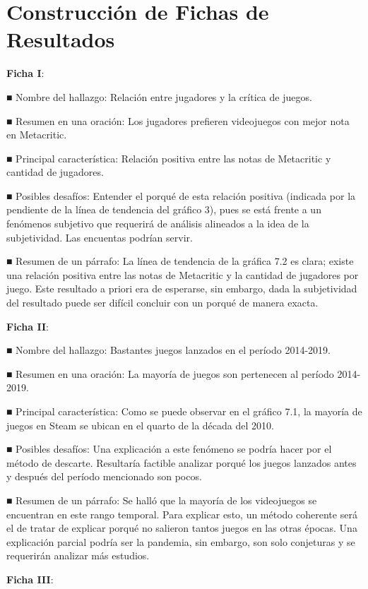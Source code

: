 \documentclass[
  letterpaper,
  DIV=11,
  numbers=noendperiod]{scrreprt}
\begin{document}
\hypertarget{construcciuxf3n-de-fichas-de-resultados}{%
\section{Construcción de Fichas de
Resultados}\label{construcciuxf3n-de-fichas-de-resultados}}

\textbf{Ficha I}:

■ Nombre del hallazgo: Relación entre jugadores y la crítica de juegos.

■ Resumen en una oración: Los jugadores prefieren videojuegos con mejor
nota en Metacritic.

■ Principal característica: Relación positiva entre las notas de
Metacritic y cantidad de jugadores.

■ Posibles desafíos: Entender el porqué de esta relación positiva
(indicada por la pendiente de la línea de tendencia del gráfico 3), pues
se está frente a un fenómenos subjetivo que requerirá de análisis
alineados a la idea de la subjetividad. Las encuentas podrían servir.

■ Resumen de un párrafo: La línea de tendencia de la gráfica 7.2 es
clara; existe una relación positiva entre las notas de Metacritic y la
cantidad de jugadores por juego. Este resultado a priori era de
esperarse, sin embargo, dada la subjetividad del resultado puede ser
difícil concluir con un porqué de manera exacta.

\textbf{Ficha II}:

■ Nombre del hallazgo: Bastantes juegos lanzados en el período
2014-2019.

■ Resumen en una oración: La mayoría de juegos son pertenecen al período
2014-2019.

■ Principal característica: Como se puede observar en el gráfico 7.1, la
mayoría de juegos en Steam se ubican en el quarto de la década del 2010.

■ Posibles desafíos: Una explicación a este fenómeno se podría hacer por
el método de descarte. Resultaría factible analizar porqué los juegos
lanzados antes y después del período mencionado son pocos.

■ Resumen de un párrafo: Se halló que la mayoría de los videojuegos se
encuentran en este rango temporal. Para explicar esto, un método
coherente será el de tratar de explicar porqué no salieron tantos juegos
en las otras épocas. Una explicación parcial podría ser la pandemia, sin
embargo, son solo conjeturas y se requerirán analizar más estudios.

\textbf{Ficha III}:
\end{document}
